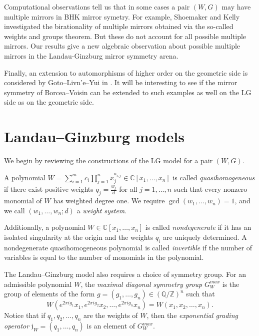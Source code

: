\documentclass[10pt, letterpaper]{amsart}
\theoremstyle{remark}
\newcommand{\ZZ}{\mathbb{Z}}
\newcommand{\jw}{\mathfrak{j}}
\newcommand{\defital}{\textit}
\newcommand{\nathan}[1]{\todo[color=pistachio,fancyline]{N:#1}}
\begin{document}
Computational observations tell us that in some cases a pair $(W,G)$ may have multiple mirrors in BHK mirror symetry.  For example, Shoemaker \cite{shoemaker} and Kelly \cite{kelly} investigated the birationality of multiple mirrors obtained via the so-called weights and groups theorem. But these do not account for all possible multiple mirrors.  Our results give a new algebraic observation about possible multiple mirrors in the Landau-Ginzburg mirror symmetry arena.

Finally, an extension to automorphisms of higher order on the geometric side is considered by Goto--Livn'e--Yui in \cite{GLY}. It will be interesting to see if the mirror symmetry of Borcea--Voisin can be extended to such examples as well on the LG side as on the geometric side.\nathan{Check this.} 




\section{Landau--Ginzburg models}\label{sec:LGmodels}
We begin by reviewing the constructions of the LG model for a pair $(W,G)$.

A polynomial 
$
W= \sum_{i=1}^m c_i\prod_{j = 1}^n x_j^{a_{i,j}}  \in \mathbb{C}[x_1, \ldots, x_n]
$
is called \defital{quasihomogeneous} if there exist positive weights $q_j=\tfrac{w_j}{d}$ for all  $j = 1, \ldots, n$ such that every nonzero monomial of $W$ has weighted degree one. We require $\gcd(w_1,\dots,w_n)=1$, and we call $(w_1,\dots,w_n;d)$ a \emph{weight system}.

Additionally, a polynomial $W \in \mathbb{C}[x_1, \ldots, x_n]$ is called \defital{nondegenerate} if it has an isolated singularity at the origin and the weights $q_i$ are uniquely determined.
A nondegenerate quasihomogeneous polynomial is called \emph{invertible} if the number of variables is equal to the number of monomials in the polynomial. 

The Landau--Ginzburg model also requires a choice of symmetry group. 
For an admissible polynomial $W$, the \defital{maximal diagonal symmetry group} $G_W^{max}$ is the group of elements of the form $g = (g_1, \ldots, g_n) \in \left(\mathbb{Q}/\ZZ\right)^n$ such that
\[
W(e^{2\pi i g_1}x_1,e^{2\pi i g_2}x_2,\ldots,e^{2\pi i g_n}x_n) = W(x_1,x_2,\ldots,x_n).
\]
\noindent Notice that if $q_1, q_2, \ldots, q_n$ are the weights of $W$, then the \emph{exponential grading operator} $\jw_W = (q_1, \ldots, q_n)$ is an element of $G_W^{max}$.  
\end{document}
